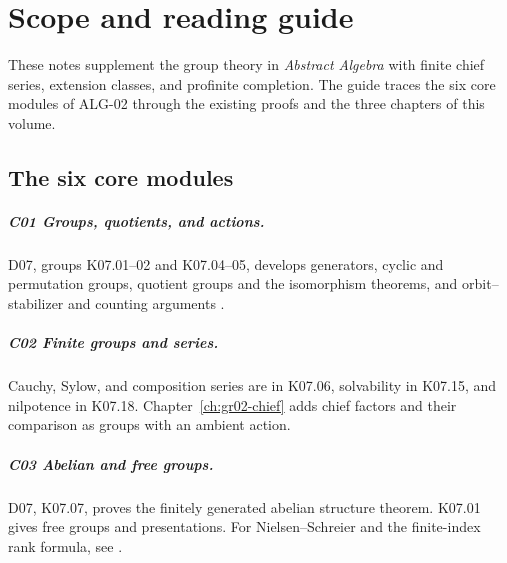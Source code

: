\chapter*{Scope and reading guide}

These notes supplement the group theory in \emph{Abstract Algebra}
with finite chief series, extension classes, and profinite completion.
The guide traces the six core modules of ALG-02 through the existing
proofs and the three chapters of this volume.

{\setlength{\fboxsep}{0.8em}\setlength{\fboxrule}{0.35pt}%
\noindent{}\par}

\section*{The six core modules}

\paragraph{C01 \enspace Groups, quotients, and actions.}
D07, groups K07.01--02 and K07.04--05, develops generators, cyclic
and permutation groups, quotient groups and the isomorphism theorems,
and orbit--stabilizer and counting arguments \cite{d07}.

\paragraph{C02 \enspace Finite groups and series.}
Cauchy, Sylow, and composition series are in K07.06, solvability
in K07.15, and nilpotence in K07.18. Chapter~\ref{ch:gr02-chief} adds
chief factors and their comparison as groups with an ambient action.

\paragraph{C03 \enspace Abelian and free groups.}
D07, K07.07, proves the finitely generated abelian structure theorem.
K07.01 gives free groups and presentations. For Nielsen--Schreier
and the finite-index rank formula, see \cite[Results B04--B05]{geomgroup}.

